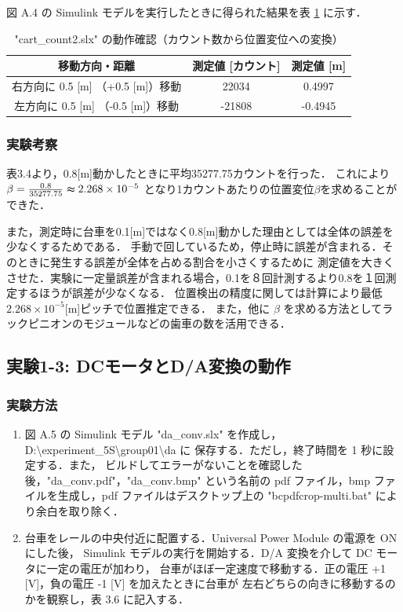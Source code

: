 図 A.4 の Simulink モデルを実行したときに得られた結果を表 \ref{tab:exp_1_2b} に示す．

\begin{table}[h]
  \centering
  \caption{"cart\_count2.slx" の動作確認（カウント数から位置変位への変換）}
  \label{tab:exp_1_2b}
  \begin{tabular}{|c|c|c|}
    \hline
    移動方向・距離                    & 測定値 [カウント] & 測定値 [m] \\
    \hline
    右方向に 0.5 [m] （+0.5 [m]）移動 & 22034             & 0.4997     \\
    \hline
    左方向に 0.5 [m] （-0.5 [m]）移動 & -21808            & -0.4945    \\
    \hline
  \end{tabular}
\end{table}

\subsubsection{実験考察}
表3.4より，0.8[m]動かしたときに平均35277.75カウントを行った．
これにより\( \beta =  \frac{0.8}{35277.75}\thickapprox 2.268\times 10^{-5}\)
となり1カウントあたりの位置変位\( \beta \)を求めることができた．

また，測定時に台車を0.1[m]ではなく0.8[m]動かした理由としては全体の誤差を少なくするためである．
手動で回しているため，停止時に誤差が含まれる．そのときに発生する誤差が全体を占める割合を小さくするために
測定値を大きくさせた．実験に一定量誤差が含まれる場合，0.1を８回計測するより0.8を１回測定するほうが誤差が少なくなる．
位置検出の精度に関しては計算により最低\(2.268\times 10^{-5}\)[m]ピッチで位置推定できる．
また，他に \(\beta\) を求める方法としてラックピニオンのモジュールなどの歯車の数を活用できる．

\subsection{実験1-3: DCモータとD/A変換の動作}

\subsubsection{実験方法}
\begin{enumerate}
  \item 図 A.5 の Simulink モデル "da\_conv.slx" を作成し，
        D:\textbackslash experiment\_5S\textbackslash group01\textbackslash da に
        保存する．ただし，終了時間を 1 秒に設定する．また，
        ビルドしてエラーがないことを確認した後，"da\_conv.pdf"，"da\_conv.bmp" という名前の
        pdf ファイル，bmp ファイルを生成し，pdf ファイルはデスクトップ上の 
        "bcpdfcrop-multi.bat" により余白を取り除く．
        
  \item 台車をレールの中央付近に配置する．Universal Power Module の電源を ON にした後，
        Simulink モデルの実行を開始する．D/A 変換を介して DC モータに一定の電圧が加わり，
        台車がほぼ一定速度で移動する．正の電圧 +1 [V]，負の電圧 -1 [V] を加えたときに台車が
        左右どちらの向きに移動するのかを観察し，表 3.6 に記入する．
        
\end{enumerate}

